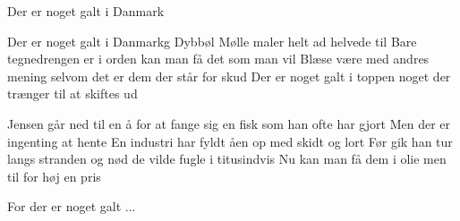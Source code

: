 \begin{sang}{Der er noget galt i Danmark}{}
\begin{vers}
Der er noget galt i Danmarkg
Dybbøl Mølle maler helt
ad helvede til
Bare tegnedrengen er i orden
kan man få det som man vil
Blæse være med andres mening
selvom det er dem
der står for skud
Der er noget galt i toppen
noget der trænger til at skiftes ud
\end{vers}
\vbox{}\vfill
\begin{vers}
Jensen går ned til en å
for at fange sig en fisk
som han ofte har gjort
Men der er ingenting at hente
En industri har fyldt åen op med
skidt og lort
Før gik han tur
langs stranden og nød
de vilde fugle i titusindvis
Nu kan man få dem i olie
men til for høj en pris
\end{vers}
\begin{vers}
For der er noget galt ...
\end{vers}
\laps
\end{sang}